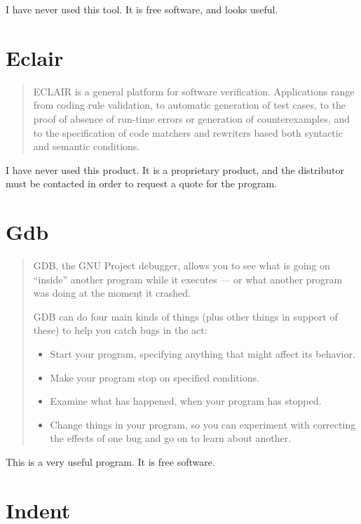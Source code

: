 \documentclass[12pt]{article}
\begin{document}
I have never used this tool. It is free software, and looks useful.

\cite{cppcheck}
\section{Eclair}

\begin{quote}
ECLAIR is a general platform for software verification. Applications
range from coding rule validation, to automatic generation of
test cases, to the proof of absence of run-time errors or generation
of counterexamples, and to the specification of code matchers and
rewriters based both syntactic and semantic conditions.
\end{quote}

I have never used this product. It is a proprietary product, and the
distributor must be contacted in order to request a quote for the program.

\cite{eclair}
\section{Gdb}

\begin{quote}
GDB, the GNU Project debugger, allows you to see what is going on
``inside'' another program while it executes --- or what another program
was doing at the moment it crashed.

GDB can do four main kinds of things (plus other things in support
of these) to help you catch bugs in the act:

\begin{itemize}
    \item Start your program, specifying anything that might affect its behavior.
    \item Make your program stop on specified conditions.
    \item Examine what has happened, when your program has stopped.
    \item Change things in your program, so you can experiment
          with correcting the effects of one bug and go on to
          learn about another.
\end{itemize}
\end{quote}

This is a very useful program. It is free software.

\cite{gdb}
\section{Indent}
\end{document}
